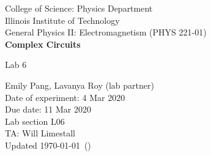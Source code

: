 \documentclass [12pt, letterpaper, twoside] {article}
\begin{document}
\begin {titlepage}
\begin {center}
College of Science: Physics Department \\
\vspace {0.1cm}
Illinois Institute of Technology \\
\vspace {0.1cm}
General Physics II: Electromagnetism (PHYS 221-01) \\
\vspace* {\fill}
\begingroup
\Large
\textbf {Complex Circuits}
\vspace {0.35cm}

\normalsize
Lab 6
\vspace {1.5cm}
\endgroup
\vspace* {\fill}
\end {center}

\vspace*{\fill}
\begin {flushright}
\footnotesize
Emily Pang, Lavanya Roy (lab partner) \\
Date of experiment: 4 Mar 2020 \\
Due date: 11 Mar 2020 \\
Lab section L06 \\
TA: Will Limestall \\
Updated \usdate\today~(\currenttime)
\end {flushright}
\end {titlepage}
\end{document}
